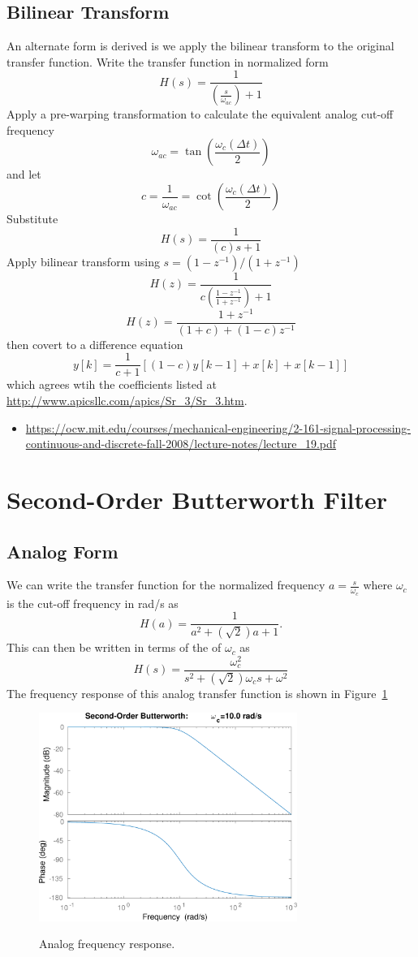 \documentclass[12pt, letterpaper]{article}
\begin{document}
\subsection{Bilinear Transform}
An alternate form is derived is we apply the bilinear transform to the original transfer function.  Write the transfer function in normalized form
\[
H(s) = \frac{1}{\left(\frac{s}{\omega_{ac}}\right)+1}
\]
Apply a pre-warping transformation to calculate the equivalent analog cut-off frequency
\[
\omega_{ac} = \tan{\left(\frac{\omega_c (\Delta t)}{2}\right)}
\]
and let
\[
c = \frac{1}{\omega_{ac}}=\cot{\left(\frac{\omega_c (\Delta t)}{2}\right)}
\]
Substitute 
\[
H(s) = \frac{1}{(c)s+1}
\]
Apply bilinear transform using $s=(1-z^{-1})/(1+z^{-1})$
\[
H(z) = \frac{1}{c\left(\frac{1-z^{-1}}{1+z^{-1}}\right)+1}
\]
\[
H(z) = \frac{1 + z^{-1}}{(1+c)+(1-c)z^{-1}}
\]
then covert to a difference equation
\[
y[k] = \frac{1}{c+1} \left[ (1-c) y[k-1] + x[k] + x[k-1] \right]
\]
which agrees wtih the coefficients listed at \url{http://www.apicsllc.com/apics/Sr_3/Sr_3.htm}.

\begin{itemize}
\item \url{https://ocw.mit.edu/courses/mechanical-engineering/2-161-signal-processing-continuous-and-discrete-fall-2008/lecture-notes/lecture_19.pdf}
\end{itemize}


\section{Second-Order Butterworth Filter}
\subsection{Analog Form}
We can write the transfer function for the normalized frequency $a=\frac{s}{\omega_c}$ where $\omega_c$ is the cut-off frequency in rad/s as
\[
H(a) = \frac{1}{a^2 + (\sqrt{2}) a + 1}.
\]
This can then be written in terms of the of $\omega_c$ as
\[
H(s) = \frac{\omega_c^2}{s^2 + (\sqrt{2})\omega_c s + \omega^2}
\]
The frequency response of this analog transfer function is shown in Figure~\ref{f:butter}
\begin{figure}[ht!]
\centering
{\includegraphics[width=0.75\textwidth]{butter_2.png}}
\caption{Analog frequency response.}
\label{f:butter}
\end{figure}
\end{document}
